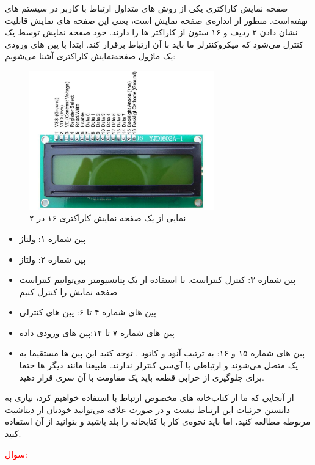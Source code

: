 \newline
صفحه نمایش کاراکتری  یکی از روش های متداول ارتباط با کاربر در سیستم های نهفته‌است. منظور از  اندازه‌ی صفحه نمایش است، یعنی این صفحه های نمایش قابلیت نشان دادن ۲ ردیف و ۱۶ ستون از کاراکتر ها را دارند. خود صفحه نمایش توسط یک  کنترل می‌شود که میکروکنترلر ما باید با آن ارتباط برقرار کند. ابتدا با پین های ورودی یک ماژول صفحه‌نمایش کاراکتری آشنا می‌شویم:
\newline
\begin{figure}[h]
    \centering
    \includegraphics[width=8cm]{lcd_pinout.png}
    \caption{نمایی از یک صفحه نمایش کاراکتری ۱۶ در ۲}
    \label{fig:lcd-pinout}
\end{figure}
\begin{itemize}
    \item پین شماره ۱: ولتاژ 
    \item پین شماره ۲: ولتاز 
    \item پین شماره ۳: کنترل کنتراست. با استفاده از یک پتانسیومتر می‌توانیم کنتراست صفحه نمایش را کنترل کنیم
    \item پین های شماره ۴ تا ۶: پین های کنترلی
    \item پین های شماره ۷ تا ۱۴:‌پین های ورودی داده
    \item پین های شماره ۱۵ و ۱۶: به ترتیب آنود و کاتود . توجه کنید این پین ها مستقیما به یک  متصل می‌شوند و ارتباطی با آی‌سی کنترلر ندارند. طبیعتا مانند دیگر  ها حتما برای جلوگیری از خرابی قطعه باید یک مقاومت با آن سری قرار دهید.
\end{itemize}
\pagebreak
از آنجایی که ما از کتاب‌خانه های مخصوص ارتباط با  استفاده خواهیم کرد، نیازی به دانستن جزئیات این ارتباط نیست و در صورت علاقه می‌توانید خودتان از دیتاشیت مربوطه مطالعه کنید، اما باید نحوه‌ی کار با کتابخانه را بلد باشید و بتوانید از آن استفاده کنید.
\newline
\textcolor{red}{\begin{nas}سوال: \end{nas}}
